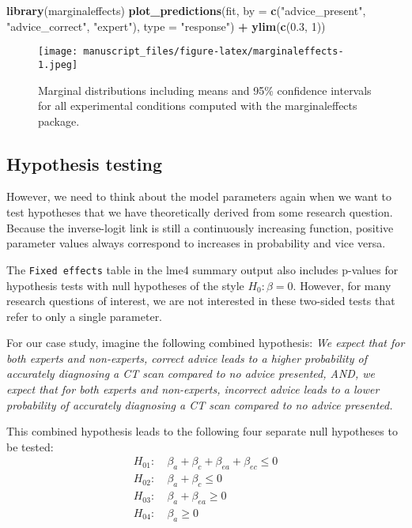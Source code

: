 \documentclass[
  man,floatsintext]{apa6}
\newenvironment{Shaded}{\begin{snugshade}}{\end{snugshade}}
\newcommand{\AttributeTok}[1]{\textcolor[rgb]{0.13,0.29,0.53}{#1}}
\newcommand{\DecValTok}[1]{\textcolor[rgb]{0.00,0.00,0.81}{#1}}
\newcommand{\FloatTok}[1]{\textcolor[rgb]{0.00,0.00,0.81}{#1}}
\newcommand{\FunctionTok}[1]{\textcolor[rgb]{0.13,0.29,0.53}{\textbf{#1}}}
\newcommand{\NormalTok}[1]{#1}
\newcommand{\SpecialCharTok}[1]{\textcolor[rgb]{0.81,0.36,0.00}{\textbf{#1}}}
\newcommand{\StringTok}[1]{\textcolor[rgb]{0.31,0.60,0.02}{#1}}
\begin{document}
\begin{Shaded}
\begin{Highlighting}[]
\FunctionTok{library}\NormalTok{(marginaleffects)}
\FunctionTok{plot\_predictions}\NormalTok{(fit, }\AttributeTok{by =} \FunctionTok{c}\NormalTok{(}\StringTok{"advice\_present"}\NormalTok{, }\StringTok{"advice\_correct"}\NormalTok{, }\StringTok{"expert"}\NormalTok{),}
  \AttributeTok{type =} \StringTok{"response"}\NormalTok{) }\SpecialCharTok{+} \FunctionTok{ylim}\NormalTok{(}\FunctionTok{c}\NormalTok{(}\FloatTok{0.3}\NormalTok{, }\DecValTok{1}\NormalTok{))}
\end{Highlighting}
\end{Shaded}

\begin{figure}
\centering
\texttt{[image: manuscript\_files/figure-latex/marginaleffects-1.jpeg]}
\caption{\label{fig:marginaleffects}Marginal distributions including means and 95\% confidence intervals for all experimental conditions computed with the marginaleffects package.}
\end{figure}

\hypertarget{hypothesis-testing}{%
\subsection{Hypothesis testing}\label{hypothesis-testing}}

However, we need to think about the model parameters again when we want to test hypotheses that we have theoretically derived from some research question. Because the inverse-logit link is still a continuously increasing function, positive parameter values always correspond to increases in probability and vice versa.

The \texttt{Fixed\ effects} table in the lme4 summary output also includes p-values for hypothesis tests with null hypotheses of the style \(H_0: \beta = 0\). However, for many research questions of interest, we are not interested in these two-sided tests that refer to only a single parameter.

For our case study, imagine the following combined hypothesis: \emph{We expect that for both experts and non-experts, correct advice leads to a higher probability of accurately diagnosing a CT scan compared to no advice presented, AND, we expect that for both experts and non-experts, incorrect advice leads to a lower probability of accurately diagnosing a CT scan compared to no advice presented.}

This combined hypothesis leads to the following four separate null hypotheses to be tested: \[
\begin{aligned}
H_{01}:\ &\beta_{a} + \beta_{c} + \beta_{ea} + \beta_{ec} \leq 0 \\
H_{02}:\ &\beta_{a} + \beta_{c} \leq 0 \\
H_{03}:\ &\beta_{a} + \beta_{ea} \geq 0 \\
H_{04}:\ &\beta_{a} \geq 0
\end{aligned}
\]
\end{document}
